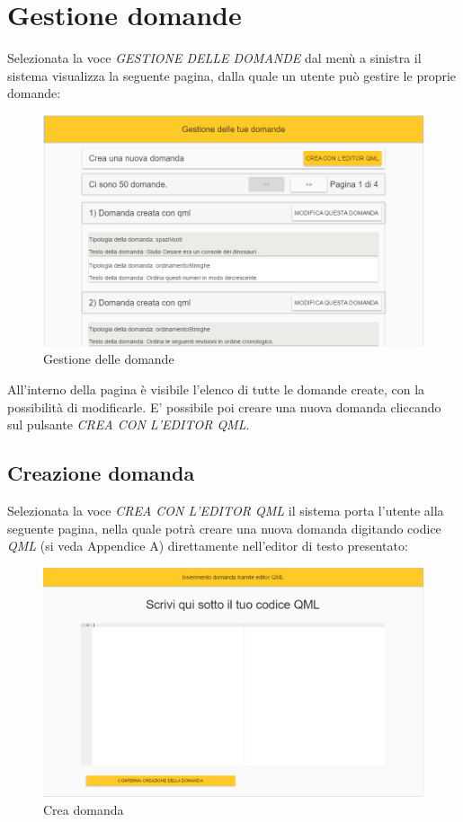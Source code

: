 \newpage
\section{Gestione domande}
Selezionata la voce \textit{GESTIONE DELLE DOMANDE} dal menù a sinistra il sistema visualizza la seguente pagina, dalla quale un utente può gestire le proprie domande:

\label{GestioneDomande}
\begin{figure}[ht]
	\centering
	\includegraphics[scale=0.45]{img/gestione_domande.png}
	\caption{Gestione delle domande}
\end{figure}
\FloatBarrier

All'interno della pagina è visibile l'elenco di tutte le domande create, con la possibilità di modificarle. E' possibile poi creare una nuova domanda cliccando sul pulsante \textit{CREA CON L'EDITOR QML}.

\newpage
\subsection{Creazione domanda}
Selezionata la voce \textit{CREA CON L'EDITOR QML} il sistema porta l'utente alla seguente pagina, nella quale potrà creare una nuova domanda digitando codice \textit{QML} (si veda Appendice A) direttamente nell'editor di testo presentato:

\label{CreaDomandaQML}
\begin{figure}[ht]
	\centering
	\includegraphics[scale=0.45]{img/creazione_domanda.png}
	\caption{Crea domanda}
\end{figure}
\FloatBarrier

